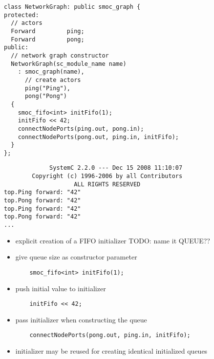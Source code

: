 \begin{frame}[fragile=singleslide]
\begin{lstlisting}
class NetworkGraph: public smoc_graph {
protected:
  // actors
  Forward         ping;
  Forward         pong;
public:
  // network graph constructor
  NetworkGraph(sc_module_name name)
    : smoc_graph(name),
      // create actors
      ping("Ping"),
      pong("Pong")
  {
    smoc_fifo<int> initFifo(1);
    initFifo << 42;
    connectNodePorts(ping.out, pong.in);
    connectNodePorts(pong.out, ping.in, initFifo);
  }
};
\end{lstlisting}
\end{frame}





\begin{frame}[fragile=singleslide]
\begin{lstlisting}
             SystemC 2.2.0 --- Dec 15 2008 11:10:07
        Copyright (c) 1996-2006 by all Contributors
                    ALL RIGHTS RESERVED
top.Ping forward: "42"
top.Pong forward: "42"
top.Ping forward: "42"
top.Pong forward: "42"
...
\end{lstlisting}
\end{frame}

\begin{frame}[fragile=singleslide]
\begin{itemize}
\item explicit creation of a FIFO initializer TODO: name it QUEUE??
\item give queue size as constructor parameter
\begin{lstlisting}
    smoc_fifo<int> initFifo(1);
\end{lstlisting}
\item push initial value to initializer
\begin{lstlisting}
    initFifo << 42;
\end{lstlisting}
\item pass initializer when constructing the queue
\begin{lstlisting}
    connectNodePorts(pong.out, ping.in, initFifo);
\end{lstlisting}
\item initializer may be reused for creating identical initialized queues
\end{itemize}
\end{frame}


